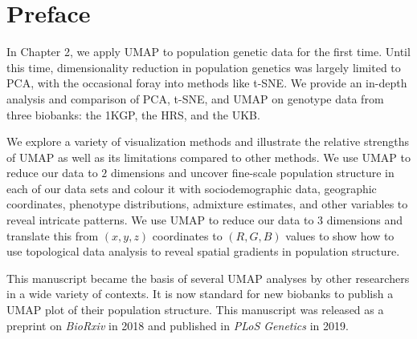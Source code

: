 \setcounter{section}{-1}

\section{Preface}

In Chapter 2, we apply UMAP to population genetic data for the first time. Until this time, dimensionality reduction in population genetics was largely limited to PCA, with the occasional foray into methods like t-SNE. We provide an in-depth analysis and comparison of PCA, t-SNE, and UMAP on genotype data from three biobanks: the 1KGP, the HRS, and the UKB.

We explore a variety of visualization methods and illustrate the relative strengths of UMAP as well as its limitations compared to other methods. We use UMAP to reduce our data to $2$ dimensions and uncover fine-scale population structure in each of our data sets and colour it with sociodemographic data, geographic coordinates, phenotype distributions, admixture estimates, and other variables to reveal intricate patterns. We use UMAP to reduce our data to $3$ dimensions and translate this from $(x,y,z)$ coordinates to $(R,G,B)$ values to show how to use topological data analysis to reveal spatial gradients in population structure.

This manuscript became the basis of several UMAP analyses by other researchers in a wide variety of contexts. It is now standard for new biobanks to publish a UMAP plot of their population structure. This manuscript was released as a preprint on \textit{BioRxiv} in 2018 and published in \textit{PLoS Genetics} in 2019.

\clearpage